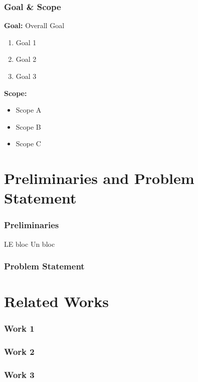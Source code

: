 \documentclass[aspectratio=169]{beamer}
\begin{document}
\begin{frame}
\frametitle{Goal \& Scope}
\textbf{Goal:} Overall Goal
\begin{enumerate}
    \item Goal 1
    \item Goal 2
    \item Goal 3
\end{enumerate}
\vspace{0.5cm}
\pause
\textbf{Scope:}
\begin{itemize}
    \item Scope A
    \item Scope B
    \item Scope C
\end{itemize}
\end{frame}

\section{Preliminaries and Problem Statement}
\begin{frame}
\frametitle{Preliminaries}
\begin{block}{LE bloc} %
    Un bloc
\end{block}
\end{frame}

\begin{frame}
\frametitle{Problem Statement}

\end{frame}

\section{Related Works}
\begin{frame}
\frametitle{Work 1}

\end{frame}

\begin{frame}
\frametitle{Work 2}

\end{frame}

\begin{frame}
\frametitle{Work 3}

\end{frame}
\end{document}
